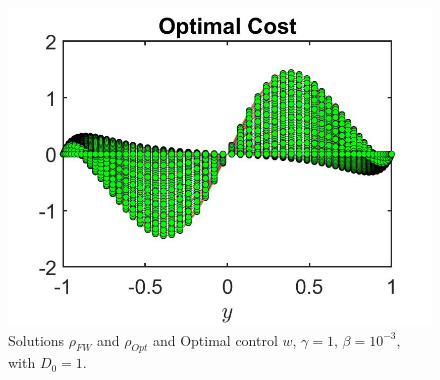 \documentclass[11pt, a4paper]{article}
\theoremstyle{definition}
\begin{document}
\begin{figure}[h]
	\includegraphics[scale=0.3]{wOptt.jpg}
	\caption{Solutions $\rho_{FW}$ and $\rho_{Opt}$ and Optimal control $w$, $\gamma = 1$, $\beta = 10^{-3}$, with $D_0 = 1$.}
	\label{rhot1}
\end{figure}
\end{document}
